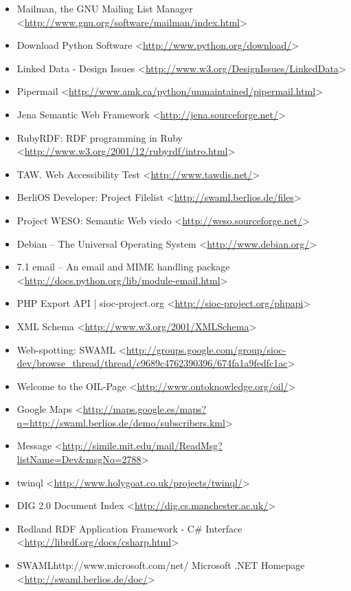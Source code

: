 \begin{itemize}
 \item Mailman, the GNU Mailing List Manager
 <\url{http://www.gnu.org/software/mailman/index.html}>
 \item Download Python Software
 <\url{http://www.python.org/download/}>
 \item Linked Data - Design Issues
 <\url{http://www.w3.org/DesignIssues/LinkedData}>
 \item Pipermail
 <\url{http://www.amk.ca/python/unmaintained/pipermail.html}>
 \item Jena Semantic Web Framework
 <\url{http://jena.sourceforge.net/}>
 \item RubyRDF: RDF programming in Ruby
 <\url{http://www.w3.org/2001/12/rubyrdf/intro.html}>
 \item TAW. Web Accessibility Test
 <\url{http://www.tawdis.net/}>
 \item BerliOS Developer: Project Filelist
 <\url{http://swaml.berlios.de/files}>
 \item Project WESO: Semantic Web viedo
 <\url{http://weso.sourceforge.net/}>
 \item Debian -- The Universal Operating System
 <\url{http://www.debian.org/}>
 \item 7.1 email -- An email and MIME handling package
 <\url{http://docs.python.org/lib/module-email.html}>
 \item PHP Export API | sioc-project.org
 <\url{http://sioc-project.org/phpapi}>
 \item XML Schema
 <\url{http://www.w3.org/2001/XMLSchema}>
 \item Web-spotting: SWAML
 <\url{http://groups.google.com/group/sioc-dev/browse_thread/thread/c9689c4762390396/674fa1a9fedfc1ac}>
 \item Welcome to the OIL-Page
 <\url{http://www.ontoknowledge.org/oil/}>
 \item Google Maps
 <\url{http://maps.google.es/maps?q=http://swaml.berlios.de/demo/subscribers.kml}>
 \item Message
 <\url{http://simile.mit.edu/mail/ReadMsg?listName=Dev&msgNo=2788}>
 \item twinql
 <\url{http://www.holygoat.co.uk/projects/twinql/}>
 \item DIG 2.0 Document Index
 <\url{http://dig.cs.manchester.ac.uk/}>
 \item Redland RDF Application Framework - C\# Interface
 <\url{http://librdf.org/docs/csharp.html}>
 \item SWAMLhttp://www.microsoft.com/net/ Microsoft .NET Homepage
 <\url{http://swaml.berlios.de/doc/}>

\end{itemize}
